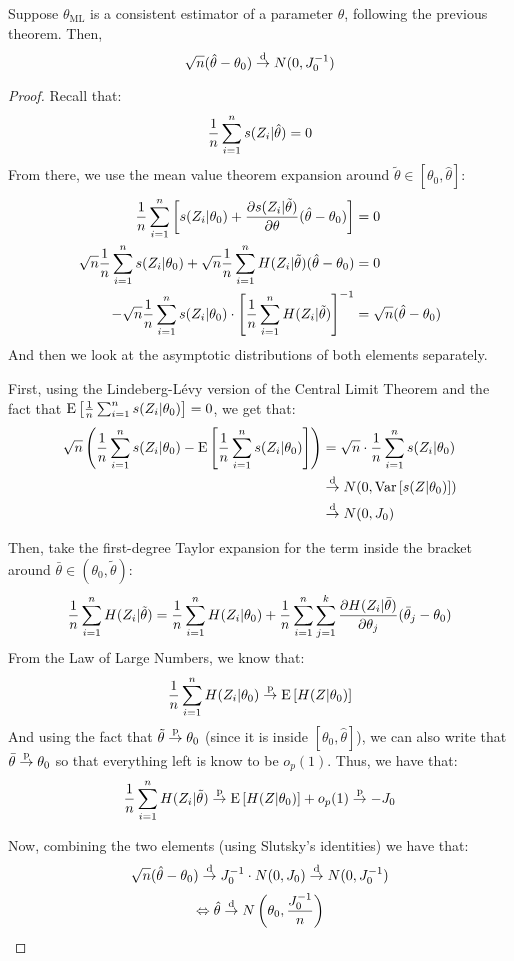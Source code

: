 \begin{theorem}
Suppose $\theta_{\text{ML}}$ is a consistent estimator of a parameter $\theta$, following the previous theorem. Then, $$\sqrt{n}(\hat\theta - \theta_0)\overset{\text{d}}{\to} N(0, J_0^{-1}) $$
\end{theorem}
\begin{proof}
Recall that: $$\frac{1}{n} \sum_{i=1}^{n} s(Z_i|\hat\theta) = 0 $$ From there, we use the mean value theorem expansion around $\tilde\theta \in [\theta_0, \hat\theta]$: \begin{align*}
\frac{1}{n} \sum_{i=1}^{n} \left[ s(Z_i|\theta_0) + \frac{\partial s(Z_i|\tilde\theta)}{\partial \theta}(\hat\theta - \theta_0)\right] & = 0 \\
\sqrt{n} \frac{1}{n} \sum_{i=1}^{n} s(Z_i|\theta_0) + \sqrt{n} \frac{1}{n} \sum_{i=1}^{n} H(Z_i|\tilde\theta)(\hat\theta - \theta_0) & = 0 \\
- \sqrt{n} \frac{1}{n} \sum_{i=1}^{n} s(Z_i|\theta_0) \cdot\left[ \frac{1}{n} \sum_{i=1}^{n} H(Z_i|\tilde\theta)\right]^{-1} & = \sqrt{n}(\hat\theta - \theta_0) \\
\end{align*}
And then we look at the asymptotic distributions of both elements separately.

First, using the Lindeberg-Lévy version of the Central Limit Theorem and the fact that $\operatorname{E}\left[ \frac{1}{n} \sum_{i=1}^{n} s(Z_i|\theta_0) \right] = 0$, we get that: \begin{align*}
\sqrt{n}\left(\frac{1}{n} \sum_{i=1}^{n} s(Z_i|\theta_0) - \operatorname{E}\left[ \frac{1}{n} \sum_{i=1}^{n} s(Z_i|\theta_0) \right]\right) & = \sqrt{n}\cdot \frac{1}{n} \sum_{i=1}^{n} s(Z_i|\theta_0) \\ &  \overset{\text{d}}{\to} N(0, \operatorname{Var}\left[s(Z|\theta_0)\right])\\ &  \overset{\text{d}}{\to} N(0, J_0)
\end{align*}

Then, take the first-degree Taylor expansion for the term inside the bracket around $\bar\theta \in (\theta_0, \tilde{\theta})$: \begin{align*}
\frac{1}{n} \sum_{i=1}^{n} H(Z_i|\tilde\theta) = \frac{1}{n} \sum_{i=1}^{n} H(Z_i|\theta_0) + \frac{1}{n} \sum_{i=1}^{n} \sum_{j=1}^{k} \frac{\partial H(Z_i|\bar\theta)}{\partial \theta_j} (\bar\theta_j - \theta_0)
\end{align*}
From the Law of Large Numbers, we know that: $$\frac{1}{n} \sum_{i=1}^{n} H(Z_i|\theta_0)\overset{\text{p}}{\to} \operatorname{E}\left[H(Z|\theta_0)\right] $$
And using the fact that $\tilde{\theta}\overset{\text{p}}{\to} \theta_0$ (since it is inside $[\theta_0, \hat\theta]$), we can also write that $\bar\theta \overset{\text{p}}{\to} \theta_0$ so that everything left is know to be $o_p(1)$. Thus, we have that: $$\frac{1}{n} \sum_{i=1}^{n} H(Z_i|\tilde\theta) \overset{\text{p}}{\to} \operatorname{E}\left[H(Z|\theta_0)\right] + o_p(1) \overset{\text{p}}{\to} -J_0 $$

Now, combining the two elements (using Slutsky's identities) we have that: $$\sqrt{n}(\hat\theta - \theta_0) \overset{\text{d}}{\to} J_0^{-1} \cdot N(0, J_0) \overset{\text{d}}{\to} N(0, J_0^{-1}) $$ $$\Leftrightarrow \hat\theta \overset{\text{d}}{\to} N \left( \theta_0, \frac{J_0^{-1}}{n} \right)$$
\end{proof}

